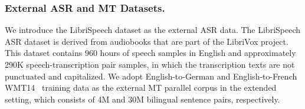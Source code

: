 \documentclass[letterpaper]{article} %
\begin{document}
\begin{table}[t]
    \centering
    \caption{The statistics of 8 translation directions in the MuST-C dataset.}
    \label{tab:must-c_stat}
\end{table}

\subsubsection*{External ASR and MT Datasets.}
We introduce the LibriSpeech dataset \cite{Panayotov2015LibrispeechAA} as the external ASR data.
The LibriSpeech ASR dataset is derived from audiobooks that are part of the LibriVox project.
This dataset contains 960 hours of speech samples in English and approximately 290K speech-transcription pair samples, in which the transcription texts are not punctuated and capitalized.
We adopt English-to-German and English-to-French WMT14~\cite{Bojar2014FindingsOT} training data as the external MT parallel corpus in the extended setting, which consists of 4M and 30M bilingual sentence pairs, respectively.
\end{document}
